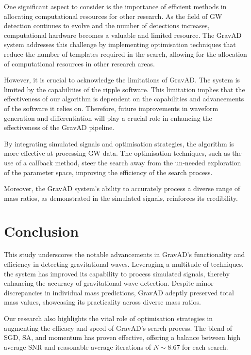 \documentclass[twocolumn, aps, pra]{revtex4-2}
\begin{document}
	One significant aspect to consider is the importance of efficient methods in allocating computational resources for other research. As the field of GW detection continues to evolve and the number of detections increases, computational hardware becomes a valuable and limited resource. The GravAD system addresses this challenge by implementing optimisation techniques that reduce the number of templates required in the search, allowing for the allocation of computational resources in other research areas.
	
	However, it is crucial to acknowledge the limitations of GravAD. The system is limited by the capabilities of the ripple software. This limitation implies that the effectiveness of our algorithm is dependent on the capabilities and advancements of the software it relies on. Therefore, future improvements in waveform generation and differentiation will play a crucial role in enhancing the effectiveness of the GravAD pipeline.
	
	By integrating simulated signals and optimisation strategies, the algorithm is more effective at processing GW data. The optimisation techniques, such as the use of a callback method, steer the search away from the un-needed exploration of the parameter space, improving the efficiency of the search process.
	
	Moreover, the GravAD system's ability to accurately process a diverse range of mass ratios, as demonstrated in the simulated signals, reinforces its credibility. 
	
	
	
	\section{Conclusion}
	
	This study underscores the notable advancements in GravAD's functionality and efficiency in detecting gravitational waves. Leveraging a multitude of techniques, the system has improved its capability to process simulated signals, thereby enhancing the accuracy of gravitational wave detection. Despite minor discrepancies in individual mass predictions, GravAD adeptly preserved total mass values, showcasing its practicality across diverse mass ratios.
	
	Our research also highlights the vital role of optimisation strategies in augmenting the efficacy and speed of GravAD's search process. The blend of SGD, SA, and momentum has proven effective, offering a balance between high average SNR and reasonable average iterations of $N\sim8.67$ for each search.
	
\end{document}
